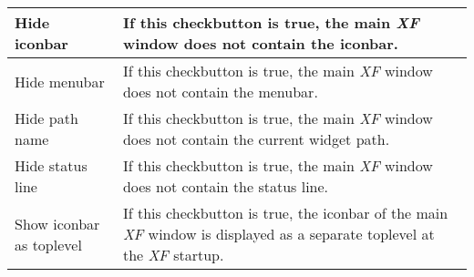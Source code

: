 {\begin{supertabular}{|l|p{5.5cm}|}
Hide iconbar                  & If this checkbutton is true,
                                the main {\em XF }
 window does not
                                contain the icon\-bar.\\  \hline
Hide menubar                  & If this checkbutton is true,
                                the main {\em XF }
 window does not
                                contain the menu\-bar.\\  \hline
Hide path name                & If this checkbutton is true,
                                the main {\em XF }
 window does not
                                contain the current widget
                                path.\\  \hline
Hide status line              & If this checkbutton is true,
                                the main {\em XF }
 window does not
                                contain the status line.\\  \hline
Show iconbar as toplevel      & If this checkbutton is true,
                                the icon\-bar of the
                                main {\em XF }
 window is displayed
                                as a separate toplevel at the
                                {\em XF }
 startup.\\
\end{supertabular}
}

{\newpage
\clearpage
\samepage \begin{figure}[hbt]
  \centerline{
  \epsfysize=5cm
  }

  \label{fig:The procedure XFProcHelpAbout}
\end{figure}
}

{\newpage
\clearpage
\samepage \begin{figure}[ht]
  \centerline{
  \epsfysize=10cm
  }

  \label{fig:CanvasLS}
\end{figure}
}

{\newpage
\clearpage
\samepage \begin{figure}[ht]
  \centerline{
  \epsfysize=1cm
  }

  \label{fig:EntryL}
\end{figure}
}

